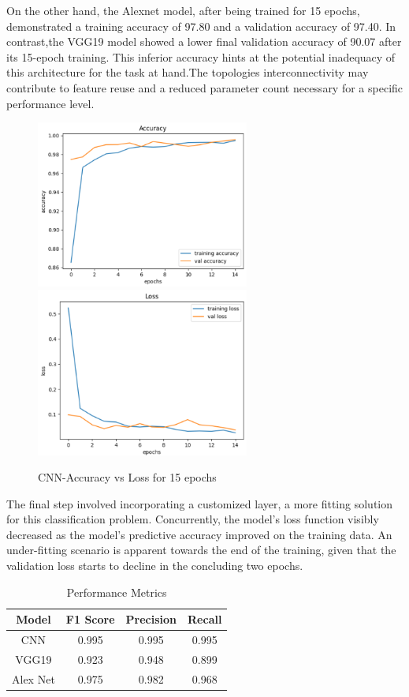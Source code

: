 \documentclass[conference]{IEEEtran}
\begin{document}
On the other hand, the Alexnet model, after being trained for 15 epochs, demonstrated a training accuracy of 97.80 and a validation accuracy of 97.40. In contrast,the VGG19 model showed a lower final validation accuracy of 90.07 after its 15-epoch training. This inferior accuracy hints at the potential inadequacy of this architecture for the task at hand.The topologies interconnectivity may contribute to feature reuse and a reduced parameter count necessary for a specific performance level.
\begin{figure}[htp]
    \centering
    \includegraphics[width=7cm]{images/Accuarcy.png}
    \label{fig:Accuracy}
    \centering
    \includegraphics[width=7cm]{images/loss.png}
    \caption{CNN-Accuracy vs Loss for 15 epochs}
    \label{fig:Loss}
\end{figure}

The final step involved incorporating a customized layer, a more fitting solution for this classification problem. Concurrently, the model's loss function visibly decreased as the model's predictive accuracy improved on the training data. An under-fitting scenario is apparent towards the end of the training, given that the validation loss starts to decline in the concluding two epochs.
\begin{table}
\caption{Performance Metrics }
\begin{center}
\begin{tabular}{||c c c c||} 
\hline
Model & F1 Score & Precision & Recall \\ [0.5ex] 
\hline\hline
CNN & 0.995 & 0.995 & 0.995 \\ 
\hline
VGG19 & 0.923 & 0.948 & 0.899 \\
\hline
Alex Net & 0.975 & 0.982 & 0.968 \\
\hline
\end{tabular}
\end{center}
\end{table}
\end{document}
